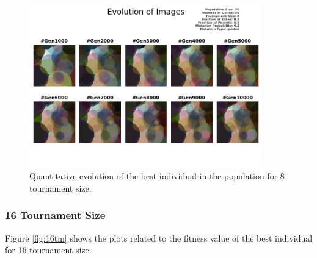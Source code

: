 \documentclass{assignment}
\begin{document}
\begin{figure}[!htb]
    \centering
    \includegraphics[width=0.9\textwidth]{figures/images_output_20_50_8_0.2_0.6_0.2_guided.png}
    \caption{Quantitative evolution of the best individual in the population for 8 tournament size.}
    \label{fig:8tm_image}
\end{figure}

\subsubsection{16 Tournament Size}
Figure \ref{fig:16tm} shows the plots related to the fitness value of the best individual for 16 tournament size.
\end{document}
